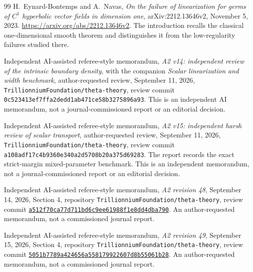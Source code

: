 \begin{thebibliography}{99}
H.~Eynard-Bontemps and A.~Navas, \emph{On the failure of linearization
for germs of $C^1$ hyperbolic vector fields in dimension one},
arXiv:2212.13646v2, November 5, 2023.
\url{https://arxiv.org/abs/2212.13646v2}.
The introduction recalls the classical one-dimensional smooth theorem
and distinguishes it from the low-regularity failures studied there.

Independent AI-assisted referee-style memorandum,
\emph{A2 v14: independent review of the intrinsic boundary density},
with the companion \emph{Scalar linearization and width benchmark},
author-requested review, September 11, 2026,
\texttt{Trillionnium\allowbreak Foundation/\allowbreak theta-theory},
review commit \texttt{0c523413\allowbreak ef7ffa2d\allowbreak edd1ab47\allowbreak 1ce58b32\allowbreak 75896a93}.
This is an independent AI memorandum, not a journal-commissioned report
or an editorial decision.

Independent AI-assisted referee-style memorandum,
\emph{A2 v15: independent harsh review of scalar transport},
author-requested review, September 11, 2026,
\texttt{Trillionnium\allowbreak Foundation/\allowbreak theta-theory},
review commit \texttt{a108adf1\allowbreak 7c4b9360\allowbreak e340a2d5\allowbreak 708b20a3\allowbreak 75d69283}.
The report records the exact strict-margin mixed-parameter benchmark.
This is an independent memorandum, not a journal-commissioned report
or an editorial decision.

Independent AI-assisted referee-style memorandum,
\emph{A2 revision 48}, September 14, 2026, Section 4,
repository \texttt{Trillionnium\allowbreak Foundation/\allowbreak theta-theory},
review commit
\href{https://github.com/TrillionniumFoundation/theta-theory/commit/a512f70ca77d711bd6c9ee61988f1e8dd4dba790}{\texttt{a512f70c\allowbreak a77d711b\allowbreak d6c9ee61\allowbreak 988f1e8d\allowbreak d4dba790}}.
An author-requested memorandum, not a commissioned journal report.


Independent AI-assisted referee-style memorandum,
\emph{A2 revision 49}, September 15, 2026, Section 4,
repository \texttt{Trillionnium\allowbreak Foundation/\allowbreak theta-theory},
review commit
\href{https://github.com/TrillionniumFoundation/theta-theory/commit/5051b7789a424656a558179922607d8b55061b28}{\texttt{5051b778\allowbreak 9a424656\allowbreak a5581799\allowbreak 22607d8b\allowbreak 55061b28}}.
An author-requested memorandum, not a commissioned journal report.



\end{thebibliography}
